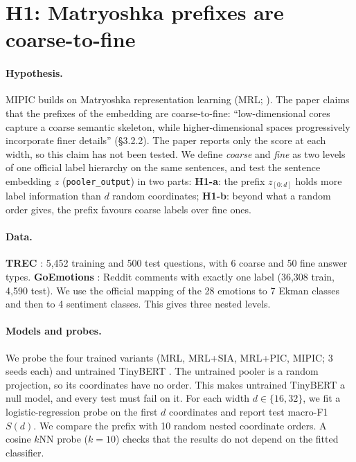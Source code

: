 \section{H1: Matryoshka prefixes are coarse-to-fine}
\label{sec:h1}

\paragraph{Hypothesis.}
MIPIC \citep{mipic2026} builds on Matryoshka representation learning (MRL; \citealp{kusupati2022mrl}).
The paper claims that the prefixes of the embedding are coarse-to-fine:
``low-dimensional cores capture a coarse semantic skeleton, while higher-dimensional spaces progressively incorporate finer details'' (\S3.2.2).
The paper reports only the score at each width, so this claim has not been tested.
We define \emph{coarse} and \emph{fine} as two levels of one official label hierarchy on the same sentences, and test the sentence embedding $z$ (\texttt{pooler\_output}) in two parts:
\textbf{H1-a}: the prefix $z_{[0:d]}$ holds more label information than $d$ random coordinates;
\textbf{H1-b}: beyond what a random order gives, the prefix favours coarse labels over fine ones.

\paragraph{Data.}
\textbf{TREC} \citep{li-roth-2002-learning}: 5,452 training and 500 test questions, with 6 coarse and 50 fine answer types.
\textbf{GoEmotions} \citep{demszky-etal-2020-goemotions}: Reddit comments with exactly one label (36,308 train, 4,590 test).
We use the official mapping of the 28 emotions to 7 Ekman classes and then to 4 sentiment classes.
This gives three nested levels.

\paragraph{Models and probes.}
We probe the four trained variants (MRL, MRL+SIA, MRL+PIC, MIPIC; 3 seeds each) and untrained TinyBERT \citep{jiao-etal-2020-tinybert}.
The untrained pooler is a random projection, so its coordinates have no order.
This makes untrained TinyBERT a null model, and every test must fail on it.
For each width $d\in\{16,32\}$, we fit a logistic-regression probe on the first $d$ coordinates and report test macro-F1 $S(d)$.
We compare the prefix with 10 random nested coordinate orders.
A cosine $k$NN probe ($k{=}10$) checks that the results do not depend on the fitted classifier.

